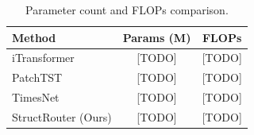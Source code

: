 \begin{table}[t]
\centering
\caption{Parameter count and FLOPs comparison.}
\label{tab:efficiency}
\begin{tabular}{l|cc}
\toprule[1.5pt]
Method & Params (M) & FLOPs \\
\midrule
iTransformer & [TODO] & [TODO] \\
PatchTST & [TODO] & [TODO] \\
TimesNet & [TODO] & [TODO] \\
StructRouter (Ours) & [TODO] & [TODO] \\
\bottomrule
\end{tabular}
\end{table}
